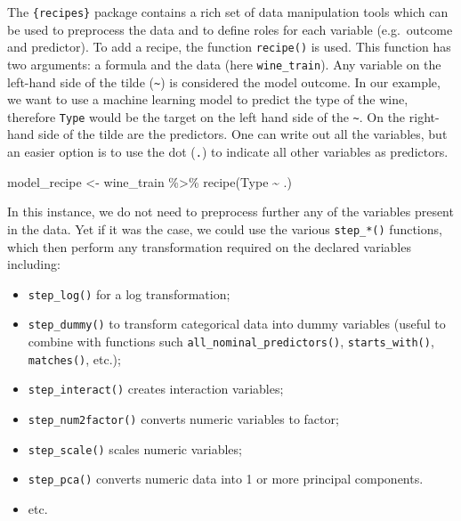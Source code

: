 \documentclass[
]{krantz}
\makeatletter
\newenvironment{Shaded}{\begin{snugshade}}{\end{snugshade}}
\newcommand{\FunctionTok}[1]{\textcolor[rgb]{0,0,0}{#1}}
\newcommand{\NormalTok}[1]{#1}
\newcommand{\OtherTok}[1]{\textcolor[rgb]{0.37,0.37,0.37}{#1}}
\newcommand{\SpecialCharTok}[1]{\textcolor[rgb]{0,0,0}{#1}}
\providecommand{\tightlist}{%
  \setlength{\itemsep}{0pt}\setlength{\parskip}{0pt}}
\newenvironment{kframe}{%
\medskip{}
\setlength{\fboxsep}{.8em}
 \def\at@end@of@kframe{}%
 \ifinner\ifhmode%
  \def\at@end@of@kframe{\end{minipage}}%
  \begin{minipage}{\columnwidth}%
 \fi\fi%
 \def\FrameCommand##1{\hskip\@totalleftmargin \hskip-\fboxsep
 \colorbox{shadecolor}{##1}\hskip-\fboxsep
     \hskip-\linewidth \hskip-\@totalleftmargin \hskip\columnwidth}%
 \MakeFramed {\advance\hsize-\width
   \@totalleftmargin\z@ \linewidth\hsize
   \@setminipage}}%
 {\par\unskip\endMakeFramed%
 \at@end@of@kframe}
\renewenvironment{Shaded}{\begin{kframe}}{\end{kframe}}
\makeatother
\begin{document}
The \texttt{\{recipes\}} package contains a rich set of data manipulation tools which can be used to preprocess the data and to define roles for each variable (e.g.~outcome and predictor). To add a recipe, the function \texttt{recipe()} is used. This function has two arguments: a formula and the data (here \texttt{wine\_train}). Any variable on the left-hand side of the tilde (\texttt{\textasciitilde{}}) is considered the model outcome. In our example, we want to use a machine learning model to predict the type of the wine, therefore \texttt{Type} would be the target on the left hand side of the \texttt{\textasciitilde{}}. On the right-hand side of the tilde are the predictors. One can write out all the variables, but an easier option is to use the dot (\texttt{.}) to indicate all other variables as predictors.

\begin{Shaded}
\begin{Highlighting}[]
\NormalTok{model\_recipe }\OtherTok{\textless{}{-}}\NormalTok{ wine\_train }\SpecialCharTok{\%\textgreater{}\%} 
  \FunctionTok{recipe}\NormalTok{(Type }\SpecialCharTok{\textasciitilde{}}\NormalTok{ .)}
\end{Highlighting}
\end{Shaded}

In this instance, we do not need to preprocess further any of the variables present in the data. Yet if it was the case, we could use the various \texttt{step\_*()} functions, which then perform any transformation required on the declared variables including:

\begin{itemize}
\tightlist
\item
  \texttt{step\_log()} for a log transformation;
\item
  \texttt{step\_dummy()} to transform categorical data into dummy variables (useful to combine with functions such \texttt{all\_nominal\_predictors()}, \texttt{starts\_with()}, \texttt{matches()}, etc.);
\item
  \texttt{step\_interact()} creates interaction variables;
\item
  \texttt{step\_num2factor()} converts numeric variables to factor;
\item
  \texttt{step\_scale()} scales numeric variables;
\item
  \texttt{step\_pca()} converts numeric data into 1 or more principal components.
\item
  etc.
\end{itemize}
\end{document}
